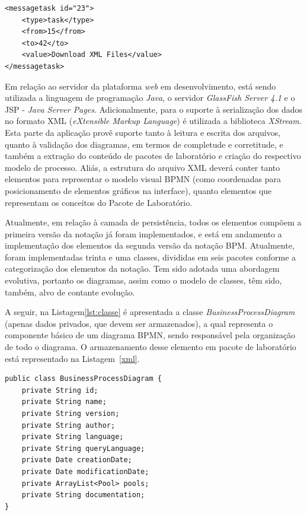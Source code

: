 \lstset{language=XML}
\begin{lstlisting}[caption=Descrição do elemento \textit{Mensagem}, label=ls:message]
<messagetask id="23">
	<type>task</type>
	<from>15</from>
	<to>42</to>
	<value>Download XML Files</value>
</messagetask>
\end{lstlisting}

Em relação ao servidor da plataforma \textit{web} em desenvolvimento, está sendo utilizada a linguagem de programação \textit{Java}, o servidor \textit{GlassFish Server 4.1} e o JSP - \textit{Java Server Pages}. Adicionalmente, para o suporte à serialização dos dados no formato XML (\textit{eXtensible Markup Language}) é utilizada a biblioteca \textit{XStream}. Esta parte da aplicação provê suporte tanto à leitura e escrita dos arquivos, quanto à validação dos diagramas, em termos de completude e corretitude, e também a extração do conteúdo de pacotes de laboratório e criação do respectivo modelo de processo. Aliás, a estrutura do arquivo XML deverá conter tanto elementos para representar o modelo visual BPMN (como coordenadas para posicionamento de elementos gráficos na interface), quanto elementos que representam os conceitos do Pacote de Laboratório.

Atualmente, em relação à camada de persistência, todos os elementos compõem a primeira versão da notação já foram implementados, e está em andamento a implementação dos elementos da segunda versão da notação BPM. Atualmente, foram implementadas trinta e uma classes, divididas em seis pacotes conforme a categorização dos elementos da notação. Tem sido adotada uma abordagem evolutiva, portanto os diagramas, assim como o modelo de classes, têm sido, também, alvo de contante evolução.


A seguir, na Listagem\ref{lst:classe} é apresentada a classe \textit{BusinessProcessDiagram} (apenas dados privados, que devem ser armazenados), a qual representa o componente básico de um diagrama BPMN, sendo responsável pela organização de todo o diagrama. O armazenamento desse elemento em pacote de laboratório está representado na Listagem~\ref{xml}.

\lstset{language=java}
\begin{lstlisting}[caption=Estrutura de Dados inicial da classe diagrama BPM, label=lst:classe]
public class BusinessProcessDiagram {
    private String id; 
    private String name; 
    private String version; 
    private String author; 
    private String language;  
    private String queryLanguage; 
    private Date creationDate;
    private Date modificationDate; 
    private ArrayList<Pool> pools; 
    private String documentation; 
}
\end{lstlisting}


